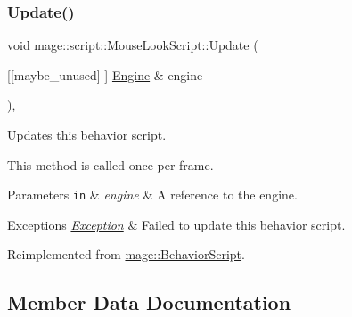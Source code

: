 \hypertarget{classmage_1_1script_1_1_mouse_look_script_a3b78aebd104b061f5d176843ef58a48a}{}\label{classmage_1_1script_1_1_mouse_look_script_a3b78aebd104b061f5d176843ef58a48a} 
\subsubsection{\texorpdfstring{Update()}{Update()}}
{\footnotesize\ttfamily void mage\+::script\+::\+Mouse\+Look\+Script\+::\+Update (\begin{DoxyParamCaption}\item[{\mbox{[}\mbox{[}maybe\+\_\+unused\mbox{]} \mbox{]} \hyperlink{classmage_1_1_engine}{Engine} \&}]{engine }\end{DoxyParamCaption})\hspace{0.3cm}{\ttfamily [override]}, {\ttfamily [virtual]}}

Updates this behavior script.

This method is called once per frame.


\begin{DoxyParams}[1]{Parameters}
\mbox{\tt in}  & {\em engine} & A reference to the engine. \\
\hline
\end{DoxyParams}

\begin{DoxyExceptions}{Exceptions}
{\em \hyperlink{classmage_1_1_exception}{Exception}} & Failed to update this behavior script. \\
\hline
\end{DoxyExceptions}


Reimplemented from \hyperlink{classmage_1_1_behavior_script_a085634661326b59850c1111e537baa4e}{mage\+::\+Behavior\+Script}.



\subsection{Member Data Documentation}
\hypertarget{classmage_1_1script_1_1_mouse_look_script_ae41f05d545c70cd621a405f6ef0cd4d5}{}\label{classmage_1_1script_1_1_mouse_look_script_ae41f05d545c70cd621a405f6ef0cd4d5} 
